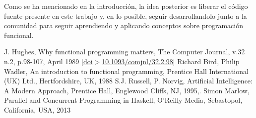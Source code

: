 \documentclass{llncs}
\begin{document}
Como se ha mencionado en la introducción, la idea posterior es liberar el código fuente presente en este trabajo y, en lo posible, seguir desarrollandolo junto a la comunidad para seguir aprendiendo y aplicando conceptos sobre programación funcional.

%
%
\begin{thebibliography}{}
    J. Hughes, Why functional programming matters, The Computer Journal, v.32 n.2, p.98-107, April 1989 \href{https://dx.doi.org/10.1093/comjnl/32.2.98}{[doi$>$10.1093/comjnl/32.2.98]}
    Richard Bird, Philip Wadler, An introduction to functional programming, Prentice Hall International (UK) Ltd., Hertfordshire, UK, 1988
    S.J. Russell, P. Norvig, Artificial Intelligence: A Modern Approach, Prentice Hall, Englewood Cliffs, NJ, 1995,.
    Simon Marlow, Parallel and Concurrent Programming in Haskell, O'Reilly Media, Sebastopol, California, USA, 2013
\end{thebibliography}
\end{document}
